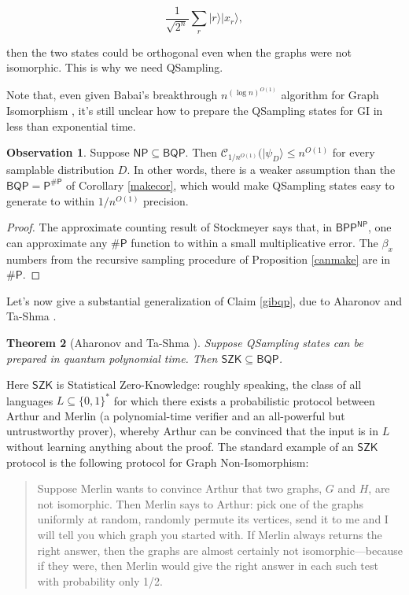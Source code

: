 \documentclass[11pt]{report}
\theoremstyle{plain}
\newtheorem{theorem}{Theorem}[section]
\theoremstyle{definition}
\newtheorem{observation}[theorem]{Observation}
\renewcommand{\ket}[1]{|#1\rangle}
\begin{document}
$$\frac{1}{\sqrt{2^n}} \sum_r \ket{r} \ket{x_r},$$

\noindent then the two states could be orthogonal even when the graphs were not isomorphic.  This is why we need QSampling.

Note that, even given Babai's breakthrough $n^{(\log n)^{O(1)}}$ algorithm for Graph Isomorphism \cite{Babai16}, it's still unclear how to prepare the QSampling states for GI in less than exponential time.

\begin{observation}
Suppose $\mathsf{NP} \subseteq \mathsf{BQP}$.  Then $\mathcal{C}_{1/n^{O(1)}} (\ket{\psi_D}\leq n^{O(1)}$ for every samplable distribution $D$.  In other words, there is a weaker assumption than the $\mathsf{BQP} = \mathsf{P^{\#P}}$ of Corollary \ref{makecor}, which would make QSampling states easy to generate to within $1/n^{O(1)}$ precision.
\end{observation}
\begin{proof}
The approximate counting result of Stockmeyer \cite{DBLP:conf/stoc/Stockmeyer83} says that, in $\mathsf{BPP^{NP}}$, one can approximate any $\#\mathsf{P}$ function to within a small multiplicative error. The $\beta_x$ numbers from the recursive sampling procedure of Proposition \ref{canmake} are in $\#\mathsf{P}$.
\end{proof}

Let's now give a substantial generalization of Claim \ref{gibqp}, due to Aharonov and Ta-Shma \cite{at}.

\begin{theorem}[Aharonov and Ta-Shma \cite{at}]\label{ATS}
Suppose QSampling states can be prepared in quantum polynomial time.  Then $\mathsf{SZK} \subseteq \mathsf{BQP}$.
\end{theorem}

Here $\mathsf{SZK}$ is Statistical Zero-Knowledge: roughly speaking, the class of all languages $L\subseteq \{0,1\}^*$ for which there exists a probabilistic protocol between Arthur and Merlin (a polynomial-time verifier and an all-powerful but untrustworthy prover), whereby Arthur can be convinced that the input is in $L$ without learning anything about the proof.  The standard example of an $\mathsf{SZK}$ protocol is the following protocol for Graph Non-Isomorphism:
\begin{quote}
Suppose Merlin wants to convince Arthur that two graphs, $G$ and $H$, are not isomorphic.  Then Merlin says to Arthur: pick one of the graphs uniformly at random, randomly permute its vertices, send it to me and I will tell you which graph you started with. If Merlin always returns the right answer, then the graphs are almost certainly not isomorphic---because if they were, then Merlin would give the right answer in each such test with probability only 1/2.
\end{quote}
\end{document}
